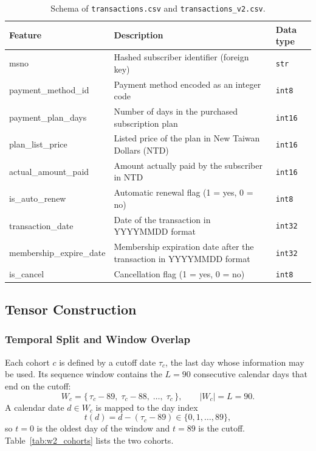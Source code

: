 \documentclass{article}
\begin{document}
\begin{table}[H]
\centering
\renewcommand{\arraystretch}{1.3}
\begin{tabularx}{\textwidth}{|l|X|l|}
\hline
\textbf{Feature} & \textbf{Description} & \textbf{Data type} \\ \hline
msno                     & Hashed subscriber identifier (foreign key) & \texttt{str} \\ \hline
payment\_method\_id      & Payment method encoded as an integer code & \texttt{int8} \\ \hline
payment\_plan\_days      & Number of days in the purchased subscription plan & \texttt{int16} \\ \hline
plan\_list\_price        & Listed price of the plan in New Taiwan Dollars (NTD) & \texttt{int16} \\ \hline
actual\_amount\_paid     & Amount actually paid by the subscriber in NTD & \texttt{int16} \\ \hline
is\_auto\_renew          & Automatic renewal flag (1 = yes, 0 = no) & \texttt{int8} \\ \hline
transaction\_date        & Date of the transaction in YYYYMMDD format & \texttt{int32} \\ \hline
membership\_expire\_date & Membership expiration date after the transaction in YYYYMMDD format & \texttt{int32} \\ \hline
is\_cancel               & Cancellation flag (1 = yes, 0 = no) & \texttt{int8} \\ \hline
\end{tabularx}
\caption{Schema of \texttt{transactions.csv} and \texttt{transactions\_v2.csv}.}
\label{tab:w2_schema_transactions}
\end{table}

\subsection{Tensor Construction}

\subsubsection{Temporal Split and Window Overlap}

Each cohort $c$ is defined by a cutoff date $\tau_c$, the last day whose information may be used. Its sequence window contains the $L = 90$ consecutive calendar days that end on the cutoff:
\begin{equation}
W_c = \{\, \tau_c - 89,\; \tau_c - 88,\; \dots,\; \tau_c \,\}, \qquad |W_c| = L = 90 .
\end{equation}
A calendar date $d \in W_c$ is mapped to the day index
\begin{equation}
t(d) = d - (\tau_c - 89) \in \{0, 1, \dots, 89\},
\end{equation}
so $t = 0$ is the oldest day of the window and $t = 89$ is the cutoff. Table~\ref{tab:w2_cohorts} lists the two cohorts.
\end{document}
